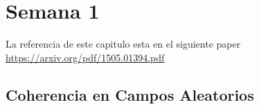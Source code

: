 \section{Semana 1}
La referencia de este capitulo esta en el siguiente paper \href{https://arxiv.org/pdf/1505.01394.pdf}{https://arxiv.org/pdf/1505.01394.pdf}
\subsection{Coherencia en Campos Aleatorios}
